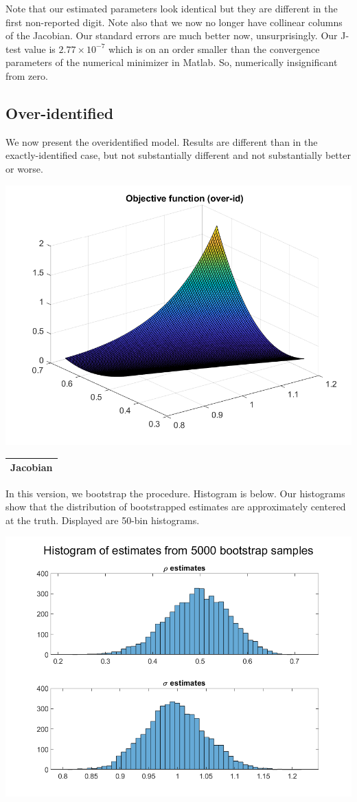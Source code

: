 \documentclass[11pt]{article} %
\begin{document}
Note that our estimated parameters look identical but they are different in the first non-reported digit. Note also that we now no longer have collinear columns of the Jacobian. Our standard errors are much better now, unsurprisingly. Our J-test value is $2.77 \times 10^{-7}$ which is on an order smaller than the convergence parameters of the numerical minimizer in Matlab. So, numerically insignificant from zero.

\subsection{Over-identified}

We now present the overidentified model. Results are different than in the exactly-identified case, but not substantially different and not substantially better or worse.

\includegraphics{obj_ov}

\begin{center}


\begin{tabular}{cc}
\hline
\multicolumn{2}{c}{Jacobian} \\
\hline

\hline
\end{tabular}
\end{center}

In this version, we bootstrap the procedure. Histogram is below. Our histograms show that the distribution of bootstrapped estimates are approximately centered at the truth. Displayed are 50-bin histograms.

\includegraphics{boot}
\end{document}
